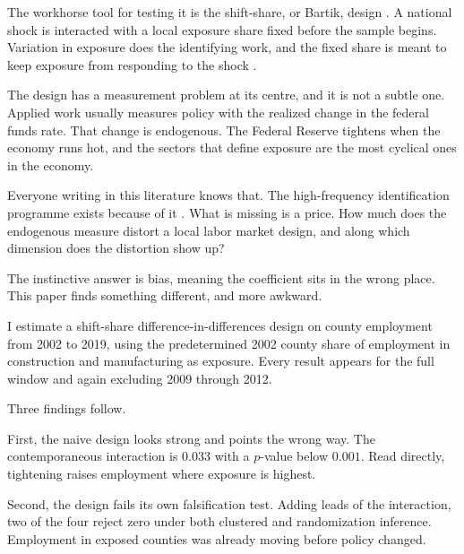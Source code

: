 The workhorse tool for testing it is the shift-share, or Bartik, design
\citep{bartik1991}. A national shock is interacted with a local exposure share
fixed before the sample begins. Variation in exposure does the identifying work,
and the fixed share is meant to keep exposure from responding to the shock
\citep{goldsmithpinkham2020}.

The design has a measurement problem at its centre, and it is not a subtle one.
Applied work usually measures policy with the realized change in the federal
funds rate. That change is endogenous. The Federal Reserve tightens when the
economy runs hot, and the sectors that define exposure are the most cyclical
ones in the economy.

Everyone writing in this literature knows that. The high-frequency
identification programme exists because of it \citep{nakamura2018, bauer2023}.
What is missing is a price. How much does the endogenous measure distort a
local labor market design, and along which dimension does the distortion show
up?

The instinctive answer is bias, meaning the coefficient sits in the wrong place.
This paper finds something different, and more awkward.

I estimate a shift-share difference-in-differences design on county employment
from 2002 to 2019, using the predetermined 2002 county share of employment in
construction and manufacturing as exposure. Every result appears for the full
window and again excluding 2009 through 2012.

Three findings follow.

First, the naive design looks strong and points the wrong way. The
contemporaneous interaction is $0.033$ with a $p$-value below $0.001$. Read
directly, tightening raises employment where exposure is highest.

Second, the design fails its own falsification test. Adding leads of the
interaction, two of the four reject zero under both clustered and randomization
inference. Employment in exposed counties was already moving before policy
changed.

